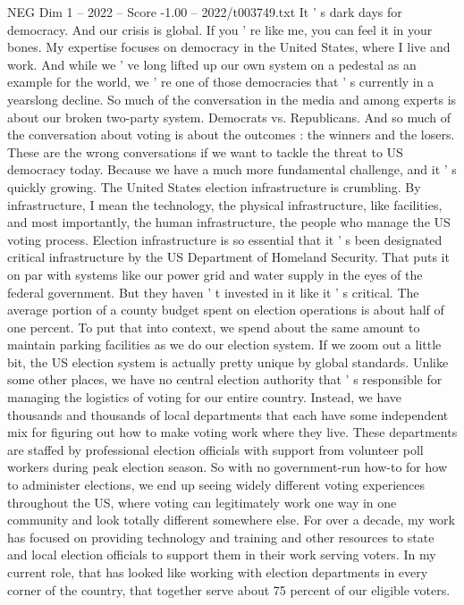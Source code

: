 \begin{textsample}{NEG Dim 1 – 2022 – Score -1.00 – 2022/t003749.txt}  \label{ex:f1_neg_012}
It ' s dark days for democracy.
And our crisis is global.
If you ' re like me, you can feel it in your bones.
My expertise focuses on democracy in the United States, where I live and work.
And while we ' ve long lifted up our own system on a pedestal as an example for the world, we ' re one of those democracies that ' s currently in a yearslong decline.
So much of the conversation in the media and among experts is about our broken two-party system.
Democrats vs.
Republicans.
And so much of the conversation about voting is about the outcomes : the winners and the losers.
These are the wrong conversations if we want to tackle the threat to US democracy today.
Because we have a much more fundamental challenge, and it ' s quickly growing.
The United States election infrastructure is crumbling.
By infrastructure, I mean the technology, the physical infrastructure, like facilities, and most importantly, the human infrastructure, the people who manage the US voting process.
Election infrastructure is so essential that it ' s been designated critical infrastructure by the US Department of Homeland Security.
That puts it on par with systems like our power grid and water supply in the eyes of the federal government.
But they haven ' t invested in it like it ' s critical.
The average portion of a county budget spent on election operations is about half of one percent.
To put that into context, we spend about the same amount to maintain parking facilities as we do our election system.
If we zoom out a little bit, the US election system is actually pretty unique by global standards.
Unlike some other places, we have no central election authority that ' s responsible for managing the logistics of voting for our entire country.
Instead, we have thousands and thousands of local departments that each have some independent mix for figuring out how to make voting work where they live.
These departments are staffed by professional election officials with support from volunteer poll workers during peak election season.
So with no government-run how-to for how to administer elections, we end up seeing widely different voting experiences throughout the US, where voting can legitimately work one way in one community and look totally different somewhere else.
For over a decade, my work has focused on providing technology and training and other resources to state and local election officials to support them in their work serving voters.
In my current role, that has looked like working with election departments in every corner of the country, that together serve about 75 percent of our eligible voters.

\end{textsample}
